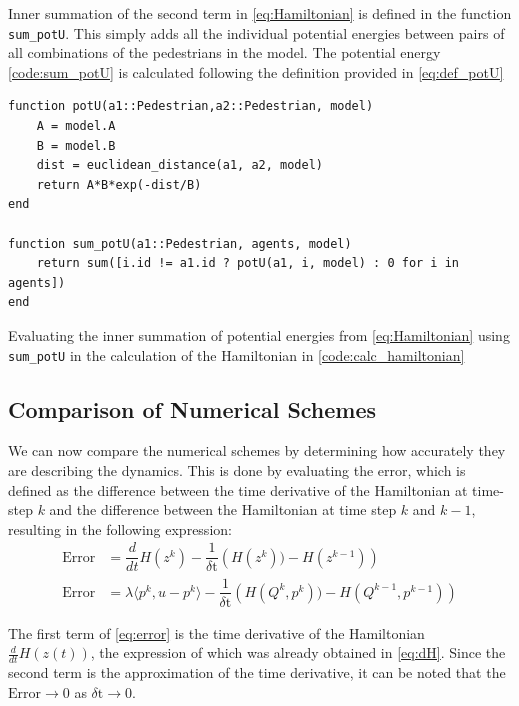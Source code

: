 Inner summation of the second term in \autoref{eq:Hamiltonian} is defined in the function \texttt{sum\_potU}. This simply adds all the individual potential energies between pairs of all combinations of the pedestrians in the model. The potential energy \autoref{code:sum_potU} is calculated following the definition provided in \autoref{eq:def_potU}
\begin{listing}[H]
\begin{verbatim}    
function potU(a1::Pedestrian,a2::Pedestrian, model)
    A = model.A
    B = model.B
    dist = euclidean_distance(a1, a2, model)
    return A*B*exp(-dist/B)
end

function sum_potU(a1::Pedestrian, agents, model)
    return sum([i.id != a1.id ? potU(a1, i, model) : 0 for i in agents])
end
\end{verbatim}
\caption{Evaluating the inner summation of potential energies from \autoref{eq:Hamiltonian} using \texttt{sum\_potU} in the calculation of the Hamiltonian in \autoref{code:calc_hamiltonian}}
\label{code:sum_potU}
\end{listing}

\pagebreak
\subsection{Comparison of Numerical Schemes}
\label{section:compare_num_solvers}
We can now compare the numerical schemes by determining how accurately they are describing the dynamics. This is done by evaluating the error, which is defined as the difference between the time derivative of the Hamiltonian at time-step $k$ and the difference between the Hamiltonian at time step $k$ and $k-1$, resulting in the following expression:
\begin{align}
    \text{Error} &= \dfrac{d}{dt}H(z^k) - \dfrac{1}{\delta \text{t}}\left(H(z^k)) - H(z^{k-1})\right) \nonumber \\ 
    \text{Error} &= \lambda\langle p^k,u-p^k\rangle - \dfrac{1}{\delta \text{t}}\left(H(Q^k, p^k)) - H(Q^{k-1}, p^{k-1})\right)
    \label{eq:error}
\end{align}

The first term of \autoref{eq:error} is the time derivative of the Hamiltonian $\frac{d}{dt}H(z(t))$, the expression of which was already obtained in \autoref{eq:dH}. Since the second term is the approximation of the time derivative, it can be noted that the $\text{Error} \rightarrow 0$ as $\delta \text{t} \rightarrow 0$. 

